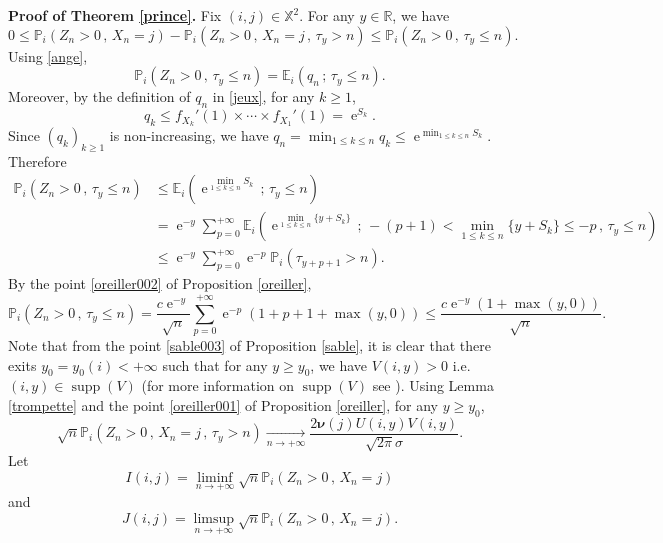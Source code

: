 \documentclass[12pt]{amsart}
\theoremstyle{definition}
\numberwithin{equation}{section}
\def\bb#1{\mathbb{#1}}
\def\bs#1{\boldsymbol{#1}}
\def\geq{\geqslant}
\def\leq{\leqslant}
\DeclareMathOperator{\e}{e}
\DeclareMathOperator{\supp}{supp}
\begin{document}
\textbf{Proof of Theorem \ref{prince}.} Fix $(i,j) \in \bb X^2$. For any $y \in \bb R$, we have
\begin{equation}
	\label{chateau}
	0 \leq \bb P_i \left( Z_n > 0 \,,\, X_n = j \right) - \bb P_i \left( Z_n > 0 \,,\, X_n = j \,,\, \tau_y > n \right) \leq \bb P_i \left( Z_n > 0 \,,\, \tau_y \leq n \right).
\end{equation}
Using \eqref{ange},
\[
\bb P_i \left( Z_n > 0 \,,\, \tau_y \leq n \right) = \bb E_i \left( q_n \,;\, \tau_y \leq n \right).
\]
Moreover, by the definition of $q_n$ in \eqref{jeux}, for any $k \geq 1$,
\[
q_k \leq f_{X_k}'(1) \times \cdots \times f_{X_1}'(1) = \e^{S_k}.
\]
Since $( q_k )_{k\geq 1}$ is non-increasing, we have $q_n  = \min_{1\leq k \leq n} q_k  \leq \e^{\min_{1\leq k \leq n} S_k}$. Therefore
\begin{align}
	\bb P_i \left( Z_n > 0 \,,\, \tau_y \leq n \right) &\leq \bb E_i \left( \e^{\min_{1\leq k \leq n} S_k} \,;\, \tau_y \leq n \right) \nonumber\\
	&= \e^{-y} \sum_{p=0}^{+\infty} \bb E_i \left( \e^{\min_{1\leq k \leq n} \{y+S_k\}} \,;\, -(p+1) < \min_{1\leq k \leq n} \{y+S_k\} \leq -p \,,\, \tau_y \leq n \right) \nonumber\\
	&\leq \e^{-y} \sum_{p=0}^{+\infty} \e^{-p}  \bb P_i \left(  \tau_{y+p+1} > n \right).
	\label{butte}
\end{align}
By the point \ref{oreiller002} of Proposition \ref{oreiller},
\begin{equation}
	\label{squaw}
	\bb P_i \left( Z_n > 0 \,,\, \tau_y \leq n \right) = \frac{c \e^{-y}}{\sqrt{n}} \sum_{p=0}^{+\infty} \e^{-p} \left(  1+p+1+\max(y,0) \right) \leq \frac{c \e^{-y}\left(  1+\max(y,0) \right)}{\sqrt{n}}.
\end{equation}
Note that from the point \ref{sable003} of Proposition \ref{sable}, it is clear that there exits $y_0 = y_0(i) < +\infty$ such that for any $y \geq y_0$, we have $V(i,y) > 0$ i.e.\ $(i,y) \in \supp (V)$ (for more information on $\supp (V)$ see \cite{grama_limit_2016-1}). Using Lemma \ref{trompette} and the point \ref{oreiller001} of Proposition \ref{oreiller}, for any $y \geq y_0$,
\begin{equation}
	\label{cheyenne}
	\sqrt{n} \bb P_i \left( Z_n > 0 \,,\, X_n = j \,,\, \tau_y > n \right) \underset{n\to+\infty}{\longrightarrow} \frac{2\bs \nu(j) U(i,y) V(i,y)}{\sqrt{2\pi}\sigma}.
\end{equation}
Let 
\[
I(i,j) = \liminf_{n \to +\infty} \sqrt{n} \bb P_i \left( Z_n > 0 \,,\, X_n = j \right)
\]
and
\[
J(i,j) = \limsup_{n \to +\infty} \sqrt{n} \bb P_i \left( Z_n > 0 \,,\, X_n = j \right).
\]
\end{document}
